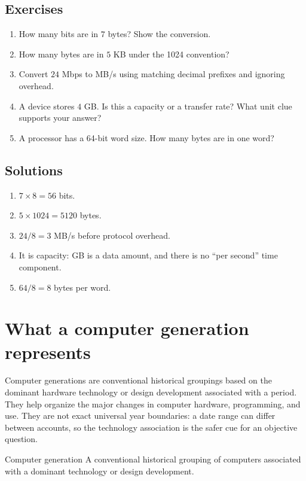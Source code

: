 \subsection*{Exercises}
\begin{enumerate}[label=\arabic*.]
  \item How many bits are in $7$ bytes? Show the conversion.
  \item How many bytes are in $5$ KB under the 1024 convention?
  \item Convert $24$ Mbps to MB/s using matching decimal prefixes and
    ignoring overhead.
  \item A device stores $4$ GB. Is this a capacity or a transfer rate? What
    unit clue supports your answer?
  \item A processor has a 64-bit word size. How many bytes are in one word?
\end{enumerate}

\subsection*{Solutions}
\begingroup\small
\begin{enumerate}[label=\arabic*.]
  \item $7\times 8=56$ bits.
  \item $5\times 1024=5120$ bytes.
  \item $24/8=3$ MB/s before protocol overhead.
  \item It is capacity: GB is a data amount, and there is no ``per second''
    time component.
  \item $64/8=8$ bytes per word.
\end{enumerate}
\endgroup

\section{What a computer generation represents}
Computer generations are conventional historical groupings based on the
dominant hardware technology or design development associated with a period.
They help organize the major changes in computer hardware, programming, and
use. They are not exact universal year boundaries: a date range can differ
between accounts, so the technology association is the safer cue for an
objective question.

\begin{definitionbox}{Computer generation}
A conventional historical grouping of computers associated with a dominant
technology or design development.
\end{definitionbox}

